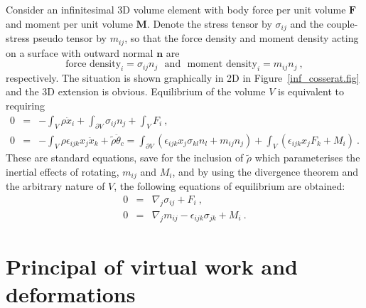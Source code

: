 \documentclass[]{scrreprt}
\newcommand{\si}{\sigma}
\newcommand{\mand}{\ \ \ \mbox{and}\ \ \ }
\newcommand{\pl}{\partial}
\newcommand{\ep}{\epsilon}
\newcommand{\non}{\nonumber}
\begin{document}
Consider an infinitesimal 3D volume element with body force per unit
volume $\mathbf{F}$ and moment per unit volume $\mathbf{M}$.  Denote
the stress tensor by $\si_{ij}$ and the couple-stress pseudo tensor by
$m_{ij}$, so that the force density and moment density acting on a
surface with outward normal $\mathbf{n}$ are
$$
\mbox{force density}_{i} = \si_{ij}n_{j} \mand
\mbox{moment density}_{i} = m_{ij}n_{j} \ ,
$$
respectively.  The situation is shown graphically in 2D in
Figure~\ref{inf_cosserat.fig} and the 3D extension is obvious.
Equilibrium of the volume $V$ is equivalent to requiring
\begin{eqnarray*}
0 & = & -\int_{V}\rho \ddot{x}_{i} + \int_{\pl V}\si_{ij}n_{j} +
\int_{V}F_{i} \ , \\ 
0 & = & -\int_{V}\rho \ep_{ijk}x_{j}\ddot{x}_{k} + \tilde{\rho}\ddot{\theta}_{c} =
\int_{\pl V}\left(\ep_{ijk}x_{j}\si_{kl}n_{l} + m_{ij}n_{j}\right) +
\int_{V}\left(\ep_{ijk}x_{j}F_{k} + M_{i}\right) \ .
\end{eqnarray*}
These are standard equations, save for the inclusion of $\tilde{\rho}$
which parameterises the inertial effects of rotating, $m_{ij}$ and
$M_{i}$, and by using the divergence theorem and the arbitrary nature
of $V$, the following equations of equilibrium are obtained:
\begin{eqnarray}
0 & = & \nabla_{j}\si_{ij} + F_{i} \ , \non \\
0 & = & \nabla_{j}m_{ij} - \ep_{ijk}\si_{jk} + M_{i} \ .
\label{eqns.equjilb}
\end{eqnarray}

\section{Principal of virtual work and deformations}
\label{pov.sec}
\end{document}
